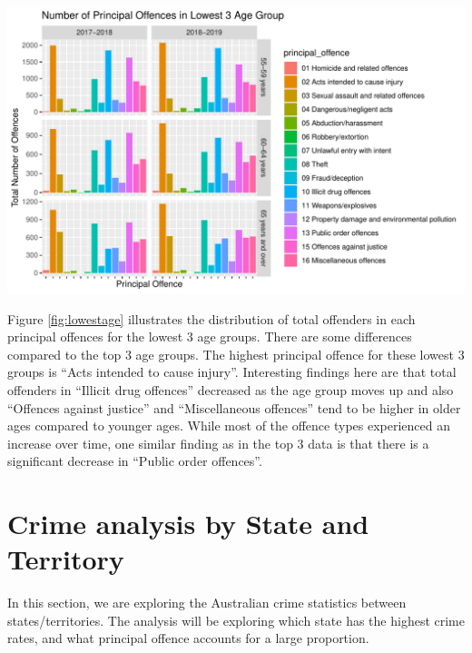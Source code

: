 \documentclass[11pt,a4paper,]{article}
\let\origfigure\figure
\let\endorigfigure\endfigure
\renewenvironment{figure}[1][2] {
\expandafter\origfigure\expandafter[H]
} {
\endorigfigure
}
\begin{document}
\begin{figure}
\centering
\includegraphics{ETC5513-Assignment4_files/figure-latex/lowestage-1.pdf}
\caption{\label{fig:lowestage}Lowest three highest age group principal offences}
\end{figure}

Figure \ref{fig:lowestage} illustrates the distribution of total offenders in each principal offences for the lowest 3 age groups. There are some differences compared to the top 3 age groups. The highest principal offence for these lowest 3 groups is ``Acts intended to cause injury''. Interesting findings here are that total offenders in ``Illicit drug offences'' decreased as the age group moves up and also ``Offences against justice'' and ``Miscellaneous offences'' tend to be higher in older ages compared to younger ages. While most of the offence types experienced an increase over time, one similar finding as in the top 3 data is that there is a significant decrease in ``Public order offences''.

\pagebreak

\section*{Crime analysis by State and Territory}

In this section, we are exploring the Australian crime statistics between states/territories. The analysis will be exploring which state has the highest crime rates, and what principal offence accounts for a large proportion.
\end{document}
